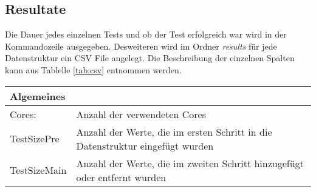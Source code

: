 \subsection{Resultate}
Die Dauer jedes einzelnen Tests und ob der Test erfolgreich war wird in der Kommandozeile ausgegeben. Desweiteren wird
im Ordner \textit{results} für jede Datenstruktur ein CSV File angelegt. Die Beschreibung der einzelnen 
Spalten kann aus Tablelle \ref{tab:csv} entnommen werden.
\begin{table}[hbt!]

	\begin{tabular}{ |m{2.5cm}|  m{13cm}| } 

		\hline
	\multicolumn{2}{|l|}{\textbf{Algemeines}}  \\  \hline
	 Cores: & 		Anzahl der verwendeten Cores    \\ \hline
	 TestSizePre& 	Anzahl der Werte, die im ersten Schritt in die Datenstruktur eingefügt wurden\\ \hline
	 TestSizeMain& 	Anzahl der Werte, die im zweiten Schritt hinzugefügt oder entfernt wurden\\ \hline
	 

\end{tabular}
\end{table}
